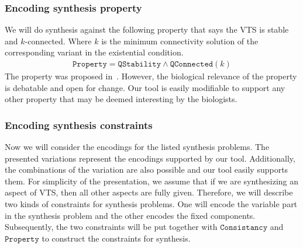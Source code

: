\subsubsection{Encoding synthesis property}
%
We will do synthesis against the following property that says the VTS
is stable and $k$-connected.
%
Where $k$ is the minimum connectivity solution of the corresponding variant in the existential condition.
%
%
\begin{align*}
\texttt{Property} =  \texttt{QStability} \land \texttt{QConnected}(k) 
\end{align*}
The property was proposed in~\cite{shukla2017discovering}.
%
However, the biological relevance of the property is debatable and open for change.
%
Our tool is easily modifiable to support any other property that may be deemed interesting by the biologists.

\subsubsection{Encoding synthesis constraints}

Now we will consider the encodings for the
listed synthesis problems.
%
The presented variations represent the encodings
supported by our tool.
%
Additionally, the combinations of the variation are also possible and
our tool easily supports them.
%
For simplicity of the presentation, we assume that if we are
synthesizing an aspect of VTS, then all other aspects are fully given.
%
Therefore, we will describe two kinds of constraints for synthesis
problems.
%
One will encode the variable part in the synthesis problem and
the other encodes the fixed components.
%
Subsequently, the two constraints will be put together with 
$\texttt{Consistancy}$ and 
$\texttt{Property}$ to construct the constraints for synthesis.

